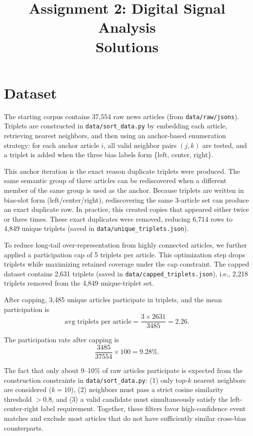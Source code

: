 \documentclass[12pt,a4paper]{article}
\title{\textbf{Assignment 2: Digital Signal Analysis}\\Solutions}
\author{}
\date{}
\begin{document}
\maketitle


\section{Dataset}

The starting corpus contains 37,554 raw news articles (from \texttt{data/raw/jsons}).
Triplets are constructed in \texttt{data/sort\_data.py} by embedding each article,
retrieving nearest neighbors, and then using an anchor-based enumeration strategy:
for each anchor article $i$, all valid neighbor pairs $(j, k)$ are tested, and a triplet is added when the three bias labels form \{left, center, right\}.

This anchor iteration is the exact reason duplicate triplets were produced.
The same semantic group of three articles can be rediscovered when a different member of the same group is used as the anchor.
Because triplets are written in bias-slot form (left/center/right), rediscovering the same 3-article set can produce an exact duplicate row.
In practice, this created copies that appeared either twice or three times.
These exact duplicates were removed, reducing 6,714 rows to 4,849 unique triplets (saved in \texttt{data/unique\_triplets.json}).

To reduce long-tail over-representation from highly connected articles, we further applied a participation cap of 5 triplets per article.
This optimization step drops triplets while maximizing retained coverage under the cap constraint.
The capped dataset contains 2,631 triplets (saved in \texttt{data/capped\_triplets.json}), i.e., 2,218 triplets removed from the 4,849 unique-triplet set.

After capping, 3,485 unique articles participate in triplets, and the mean participation is
\[
\text{avg triplets per article} = \frac{3 \times 2631}{3485} = 2.26.
\]

The participation rate after capping is
\[
\frac{3485}{37554} \times 100 = 9.28\%.
\]

The fact that only about 9--10\% of raw articles participate is expected from the construction constraints in \texttt{data/sort\_data.py}:
(1) only top-$k$ nearest neighbors are considered ($k=10$),
(2) neighbors must pass a strict cosine similarity threshold $>0.8$,
and (3) a valid candidate must simultaneously satisfy the left-center-right label requirement.
Together, these filters favor high-confidence event matches and exclude most articles that do not have sufficiently similar cross-bias counterparts.
\end{document}
